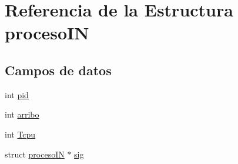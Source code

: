 \hypertarget{structprocesoIN}{\section{Referencia de la Estructura proceso\-I\-N}
\label{structprocesoIN}
}
\subsection*{Campos de datos}
\begin{DoxyCompactItemize}
\item 
int \hyperlink{structprocesoIN_a1f98173923093415811c68330209846b}{pid}
\item 
int \hyperlink{structprocesoIN_a7a179c23dee4ce77f77d83059d1a6559}{arribo}
\item 
int \hyperlink{structprocesoIN_afd693c15ca8466745ab5a5bf21ef71dd}{Tcpu}
\item 
struct \hyperlink{structprocesoIN}{proceso\-I\-N} $\ast$ \hyperlink{structprocesoIN_a965fc90480b32b05d2760bf28923c570}{sig}
\end{DoxyCompactItemize}


